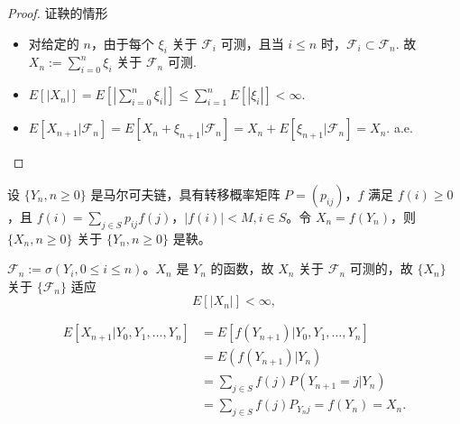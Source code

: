 \documentclass[lang=cn,10pt,thmcnt=section]{elegantbook}
\begin{document}
\begin{proof}
	证鞅的情形
\begin{itemize}
    \item 对给定的 $n$，由于每个 $\xi_i$ 关于 $\mathcal{F}_i$ 可测，且当 $i \leq n$ 时，$\mathcal{F}_i \subset \mathcal{F}_n$. 故 $X_n := \sum_{i=0}^n \xi_i$ 关于 $\mathcal{F}_n$ 可测.
    \item $E[|X_n|] = E[\left|\sum_{i=0}^n \xi_i\right|] \leq \sum_{i=1}^n E[|\xi_i|] < \infty$.
    \item $E[X_{n+1}|\mathcal{F}_n] = E[X_n + \xi_{n+1}|\mathcal{F}_n] = X_n + E[\xi_{n+1}|\mathcal{F}_n] = X_n.$ a.e.
\end{itemize}
\end{proof}


设 $\{Y_n, n \geq 0\}$ 是马尔可夫链，具有转移概率矩阵 $P = (p_{ij})$，$f$ 满足 $f(i) \geq 0$，且 $f(i) = \sum_{j \in S} p_{ij} f(j)$，$|f(i)| < M, i \in S$。令 $X_n = f(Y_n)$，则 $\{X_n, n \geq 0\}$ 关于 $\{Y_n, n \geq 0\}$ 是鞅。

$\mathcal{F}_n := \sigma(Y_i, 0 \leq i \leq n)$。$X_n$ 是 $Y_n$ 的函数，故 $X_n$ 关于 $\mathcal{F}_n$ 可测的，故 $\{X_n\}$ 关于 $\{\mathcal{F}_n\}$ 适应
\[
E[|X_n|] < \infty,
\]

\begin{align*}
E[X_{n+1}|Y_0, Y_1, \ldots, Y_n] &= E[f(Y_{n+1})|Y_0, Y_1, \ldots, Y_n] \\
&= E(f(Y_{n+1})|Y_n) \\
&= \sum_{j \in S} f(j) P(Y_{n+1} = j|Y_n) \\
&= \sum_{j \in S} f(j) P_{Y_n j} = f(Y_n) = X_n.
\end{align*}
\end{document}
